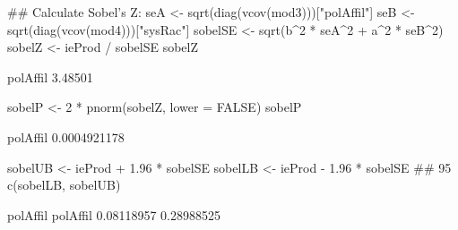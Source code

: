 \begin{Schunk}
\begin{Sinput}
 ## Calculate Sobel's Z:
 seA <- sqrt(diag(vcov(mod3)))["polAffil"]
 seB <- sqrt(diag(vcov(mod4)))["sysRac"]
 sobelSE <- sqrt(b^2 * seA^2 + a^2 * seB^2)
 sobelZ <- ieProd / sobelSE
 sobelZ
\end{Sinput}
\begin{Soutput}
polAffil 
 3.48501 
\end{Soutput}
\begin{Sinput}
 sobelP <- 2 * pnorm(sobelZ, lower = FALSE)
 sobelP
\end{Sinput}
\begin{Soutput}
    polAffil 
0.0004921178 
\end{Soutput}
\begin{Sinput}
 sobelUB <- ieProd + 1.96 * sobelSE
 sobelLB <- ieProd - 1.96 * sobelSE
 ## 95% Sobel CI:
 c(sobelLB, sobelUB)
\end{Sinput}
\begin{Soutput}
  polAffil   polAffil 
0.08118957 0.28988525 
\end{Soutput}
\end{Schunk}
